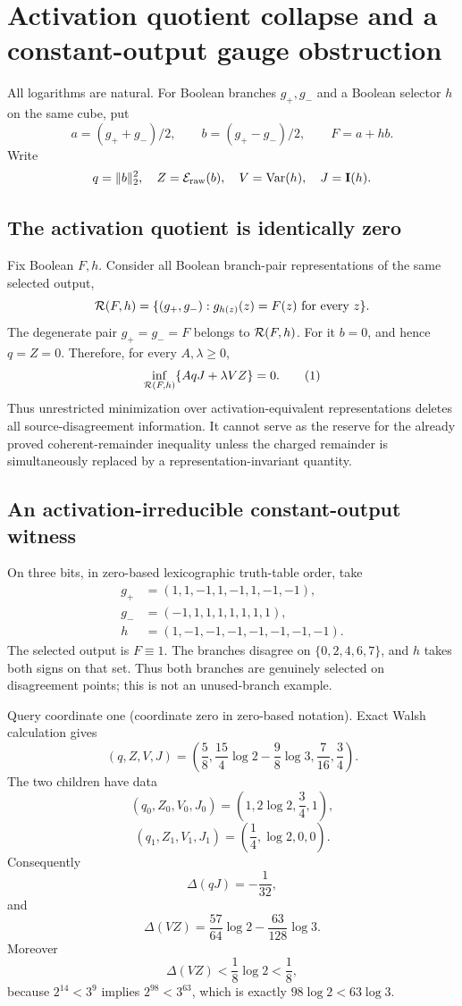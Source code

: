 \section*{Activation quotient collapse and a constant-output gauge obstruction}

All logarithms are natural.  For Boolean branches $g_+,g_-$ and a Boolean
selector $h$ on the same cube, put
\[
 a=(g_++g_-)/2,\qquad b=(g_+-g_-)/2,\qquad F=a+hb.
\]
Write
\[
 q=\|b\|_2^2,\quad Z={\cal E}_{\rm raw}(b),\quad
 V=\operatorname{Var}(h),\quad J=\mathbf I(h).
\]

\subsection*{The activation quotient is identically zero}

Fix Boolean $F,h$.  Consider all Boolean branch-pair representations of the
same selected output,
\[
 {\cal R}(F,h)=\{(g_+,g_-):g_{h(z)}(z)=F(z)\text{ for every }z\}.
\]
The degenerate pair $g_+=g_-=F$ belongs to ${\cal R}(F,h)$.  For it $b=0$,
and hence $q=Z=0$.  Therefore, for every $A,\lambda\ge0$,
\[
 \inf_{{\cal R}(F,h)}\{AqJ+\lambda VZ\}=0.                 \tag{1}
\]
Thus unrestricted minimization over activation-equivalent representations
deletes all source-disagreement information.  It cannot serve as the reserve
for the already proved coherent-remainder inequality unless the charged
remainder is simultaneously replaced by a representation-invariant quantity.

\subsection*{An activation-irreducible constant-output witness}

On three bits, in zero-based lexicographic truth-table order, take
\[
\begin{split}
 g_+&=(1,1,-1,1,-1,1,-1,-1),\\
 g_-&=(-1,1,1,1,1,1,1,1),\\
 h&=(1,-1,-1,-1,-1,-1,-1,-1).
\end{split}                                                   \tag{2}
\]
The selected output is $F\equiv1$.  The branches disagree on
$\{0,2,4,6,7\}$, and $h$ takes both signs on that set.  Thus both branches
are genuinely selected on disagreement points; this is not an unused-branch
example.

Query coordinate one (coordinate zero in zero-based notation).  Exact Walsh
calculation gives
\[
 (q,Z,V,J)=\left(\frac58,\frac{15}{4}\log2-\frac98\log3,
                  \frac7{16},\frac34\right).
\]
The two children have data
\[
 (q_0,Z_0,V_0,J_0)=\left(1,2\log2,\frac34,1\right),
\]
\[
 (q_1,Z_1,V_1,J_1)=\left(\frac14,\log2,0,0\right).
\]
Consequently
\[
 \Delta(qJ)=-\frac1{32},                                      \tag{3}
\]
and
\[
 \Delta(VZ)=\frac{57}{64}\log2-\frac{63}{128}\log3.          \tag{4}
\]
Moreover
\[
 \Delta(VZ)<\frac18\log2<\frac18,                            \tag{5}
\]
because $2^{14}<3^9$ implies $2^{98}<3^{63}$, which is exactly
$98\log2<63\log3$.

